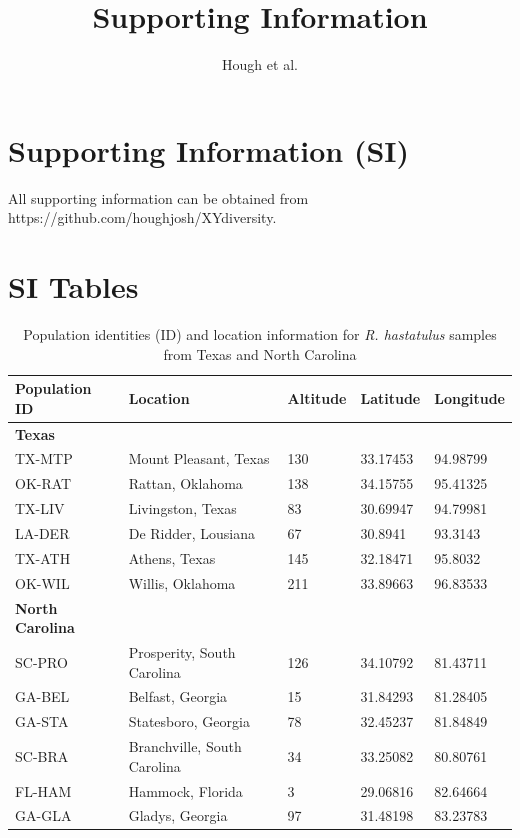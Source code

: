 \documentclass[9pt,onecolumn,twoside]{pnas-new}
\title{Supporting Information}
\author{Hough et al.}
\begin{document}
\maketitle

\section*{Supporting Information (SI)}

All supporting information can be obtained from https://github.com/houghjosh/XYdiversity.

\section*{SI Tables}

\begin{table}[tbhp!]
\centering
\caption{Population identities (ID) and location information for \textit{R. hastatulus} samples from Texas and North Carolina}
\begin{tabular}{lllll}
Population ID & Location & Altitude & Latitude & Longitude \\
\midrule
\textbf{Texas} &  &  &  &  \\
TX-MTP & Mount Pleasant, Texas & 130	 & 33.17453 & 94.98799 \\
OK-RAT & Rattan, Oklahoma & 138 & 34.15755 & 95.41325 \\
TX-LIV & Livingston, Texas & 83 & 30.69947 & 94.79981 \\
LA-DER & De Ridder, Lousiana & 67 & 30.8941 & 93.3143 \\
TX-ATH & Athens, Texas & 145 & 32.18471 & 95.8032 \\
OK-WIL & Willis, Oklahoma & 211 & 33.89663 & 96.83533 \\
\textbf{North Carolina} &  &  &  &  \\
SC-PRO & Prosperity, South Carolina & 126 & 34.10792 & 81.43711 \\
GA-BEL & Belfast, Georgia & 15 & 31.84293 & 81.28405 \\
GA-STA & Statesboro, Georgia & 78 & 32.45237 & 81.84849 \\
SC-BRA & Branchville, South Carolina & 	34 & 33.25082 & 80.80761 \\
FL-HAM & Hammock, Florida & 3 & 29.06816 & 82.64664 \\
GA-GLA & Gladys, Georgia	 & 97 & 31.48198 & 83.23783 \\
\bottomrule
\end{tabular}
\end{table}
\end{document}
